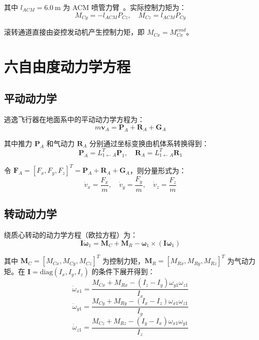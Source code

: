  其中 $l_{ACM}=6.0\ \mathrm m$ 为 ACM 喷管力臂~\cite{mcgowan2011overview}。实际控制力矩为：
\begin{equation}
M_{Cy}=-l_{ACM}P_{Cz},\quad
M_{Cz}=l_{ACM}P_{Cy} 
\end{equation}

滚转通道直接由姿控发动机产生控制力矩，即 $M_{Cx}=M_{Cx}^{cmd}$。

\section{六自由度动力学方程}

\subsection{平动动力学}

逃逸飞行器在地面系中的平动动力学方程为：
\begin{equation}
m\dot{\mathbf v}_A=\mathbf P_A+\mathbf R_A+\mathbf G_A 
\end{equation}

其中推力 $\mathbf P_A$ 和气动力 $\mathbf R_A$ 分别通过坐标变换由机体系转换得到：
\begin{equation}
\mathbf P_A=L_{1\leftarrow A}^T\mathbf P_1,\quad
\mathbf R_A=L_{1\leftarrow A}^T\mathbf R_1 
\end{equation}

令 $\mathbf F_A=[F_x,F_y,F_z]^T=\mathbf P_A+\mathbf R_A+\mathbf G_A$，则分量形式为：
\begin{equation}
\dot v_x=\frac{F_x}{m},\quad
\dot v_y=\frac{F_y}{m},\quad
\dot v_z=\frac{F_z}{m} 
\end{equation}

\subsection{转动动力学}

绕质心转动的动力学方程（欧拉方程）为：
\begin{equation}
\mathbf I\dot{\boldsymbol\omega}_1=\mathbf M_C+\mathbf M_R-\boldsymbol\omega_1\times(\mathbf I\boldsymbol\omega_1) 
\end{equation}

其中 $\mathbf M_C=[M_{Cx},M_{Cy},M_{Cz}]^T$ 为控制力矩，$\mathbf M_R=[M_{Rx},M_{Ry},M_{Rz}]^T$ 为气动力矩。在 $\mathbf I=\mathrm{diag}(I_x,I_y,I_z)$ 的条件下展开得到：
\begin{equation}
\dot\omega_{x1}=\frac{M_{Cx}+M_{Rx}-(I_z-I_y)\omega_{y1}\omega_{z1}}{I_x} 
\end{equation}
\begin{equation}
\dot\omega_{y1}=\frac{M_{Cy}+M_{Ry}-(I_x-I_z)\omega_{x1}\omega_{z1}}{I_y} 
\end{equation}
\begin{equation}
\dot\omega_{z1}=\frac{M_{Cz}+M_{Rz}-(I_y-I_x)\omega_{x1}\omega_{y1}}{I_z} 
\end{equation}

